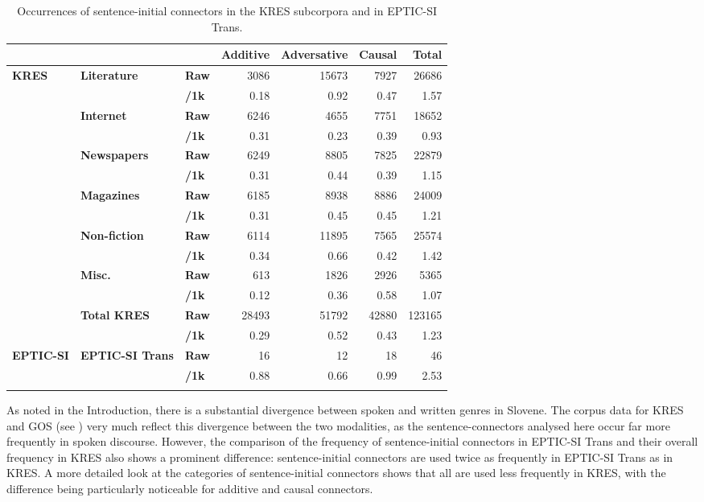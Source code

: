 \documentclass[output=paper]{langscibook}
\begin{document}
\begin{table}
\small
    \begin{tabularx}{\textwidth}{lllrrrr}
    \lsptoprule
         & & & \textbf{Additive} &	\textbf{Adversative}	& \textbf{Causal} &	\textbf{Total}  \\
         \midrule
         \multirow{14}{*}{\textbf{KRES}}& \textbf{Literature} &	\textbf{Raw} &	3086 &	15673 &	7927 &	26686\\
	    & &             \textbf{/1k} &	0.18 &	0.92 &	0.47 &	1.57\\
        & \textbf{Internet} &	\textbf{Raw} &	6246 &	4655 &	7751 &	18652\\
	    & &            \textbf{/1k} &	0.31 &	0.23 &	0.39 &	0.93\\
        & \textbf{Newspapers}	& \textbf{Raw} &	6249 &	8805 &	7825 &	22879\\
	   &&             \textbf{/1k}	& 0.31 & 	0.44 &	0.39 &	1.15\\
        & \textbf{Magazines}	& \textbf{Raw} &	6185 &	8938 &	8886 &	24009\\
	   &&         \textbf{/1k} &	0.31 &	0.45 &	0.45 &	1.21\\
        & \textbf{Non-fiction} &	\textbf{Raw} &	6114 & 11895 &	7565 &	25574\\
 	  &&          \textbf{/1k} &	0.34 &	0.66 &	0.42 &	1.42\\
        & \textbf{Misc.} &	\textbf{Raw} &	613 &	1826 &	2926 &	5365\\
	  &&          \textbf{/1k} &	0.12 &	0.36 &	0.58 &	1.07\\
        & \textbf{Total KRES} &	\textbf{Raw} &	28493 &	51792 &	42880 &	123165\\
	  &&          \textbf{/1k} &	0.29 &	0.52 &	0.43 &	1.23\\
        \textbf{EPTIC-SI} & \textbf{EPTIC-SI Trans} &	\textbf{Raw} &	16 &	12 &	18 &	46\\
    &&        	\textbf{/1k} &	0.88 &	0.66 &	0.99 &	2.53\\ 
    \lspbottomrule
    \end{tabularx}
    \caption{Occurrences of sentence-initial connectors in the KRES subcorpora and in EPTIC-SI Trans.}
    \label{tab:mikolic:6}
\end{table}

As noted in the Introduction, there is a substantial divergence between spoken and written genres in Slovene. The corpus data for KRES and GOS (see ) very much reflect this divergence between the two modalities, as the sentence-connectors analysed here occur far more frequently in spoken discourse. However, the comparison of the frequency of sentence-initial connectors in EPTIC-SI Trans and their overall frequency in KRES also shows a prominent difference: sentence-initial connectors are used twice as frequently in EPTIC-SI Trans as in KRES. A more detailed look at the categories of sentence-initial connectors shows that all are used less frequently in KRES, with the difference being particularly noticeable for additive and causal connectors.
\end{document}
